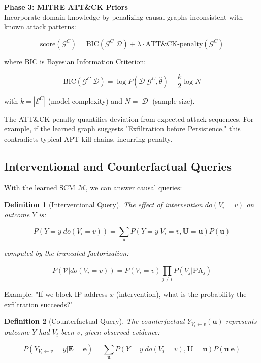 \documentclass[conference]{IEEEtran}
\newtheorem{definition}{Definition}
\begin{document}
\textbf{Phase 3: MITRE ATT\&CK Priors} \\
Incorporate domain knowledge by penalizing causal graphs inconsistent with known attack patterns:

\begin{equation}
\text{score}(\mathcal{G}^C) = \text{BIC}(\mathcal{G}^C | \mathcal{D}) + \lambda \cdot \text{ATT\&CK-penalty}(\mathcal{G}^C)
\end{equation}

where BIC is Bayesian Information Criterion:

\begin{equation}
\text{BIC}(\mathcal{G}^C | \mathcal{D}) = \log P(\mathcal{D} | \mathcal{G}^C, \hat{\theta}) - \frac{k}{2}\log N
\end{equation}

with $k = |\mathcal{E}^C|$ (model complexity) and $N = |\mathcal{D}|$ (sample size).

The ATT\&CK penalty quantifies deviation from expected attack sequences. For example, if the learned graph suggests "Exfiltration before Persistence," this contradicts typical APT kill chains, incurring penalty.

\subsection{Interventional and Counterfactual Queries}

With the learned SCM $\mathcal{M}$, we can answer causal queries:

\begin{definition}[Interventional Query]
The effect of intervention $do(V_i = v)$ on outcome $Y$ is:

\begin{equation}
P(Y = y | do(V_i = v)) = \sum_{\mathbf{u}} P(Y = y | V_i = v, \mathbf{U} = \mathbf{u}) P(\mathbf{u})
\end{equation}

computed by the truncated factorization:

\begin{equation}
P(\mathcal{V} | do(V_i = v)) = P(V_i = v) \prod_{j \neq i} P(V_j | \text{PA}_j)
\end{equation}
\end{definition}

Example: "If we block IP address $x$ (intervention), what is the probability the exfiltration succeeds?"

\begin{definition}[Counterfactual Query]
The counterfactual $Y_{V_i \leftarrow v}(\mathbf{u})$ represents outcome $Y$ had $V_i$ been $v$, given observed evidence:

\begin{equation}
P(Y_{V_i \leftarrow v} = y | \mathbf{E} = \mathbf{e}) = \sum_{\mathbf{u}} P(Y = y | do(V_i = v), \mathbf{U} = \mathbf{u}) P(\mathbf{u} | \mathbf{e})
\end{equation}
\end{definition}
\end{document}
